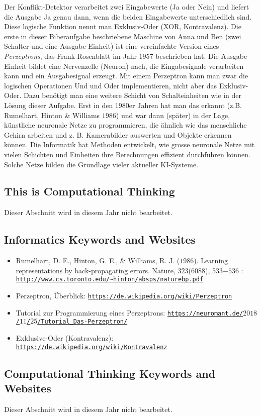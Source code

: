 \documentclass[a4paper,11pt]{report}
\newcommand{\BrochureUrlText}[1]{\texttt{#1}}
\begin{document}
Der Konflikt-Detektor verarbeitet zwei Eingabewerte (Ja oder Nein) und liefert die Ausgabe Ja genau dann, wenn die beiden Eingabewerte unterschiedlich sind. Diese logische Funktion nennt man Exklusiv-Oder (XOR, Kontravalenz). Die erste in dieser Biberaufgabe beschriebene Maschine von Anna und Ben (zwei Schalter und eine Ausgabe-Einheit) ist eine vereinfachte Version eines \emph{Perzeptrons}, das Frank Rosenblatt im Jahr $1957$ beschrieben hat. Die Ausgabe-Einheit bildet eine Nervenzelle (Neuron) nach, die Eingabesignale verarbeiten kann und ein Ausgabesignal erzeugt. Mit einem Perzeptron kann man zwar die logischen Operationen Und und Oder implementieren, nicht aber das Exklusiv-Oder. Dazu benötigt man eine weitere Schicht von Schalteinheiten wie in der Lösung dieser Aufgabe. Erst in den 1980er Jahren hat man das erkannt (z.B. Rumelhart, Hinton \& Williams $1986$) und war dann (später) in der Lage, künstliche neuronale Netze zu programmieren, die ähnlich wie das menschliche Gehirn arbeiten und z. B. Kamerabilder auswerten und Objekte erkennen können.  Die Informatik hat Methoden entwickelt, wie grosse neuronale Netze mit vielen Schichten und Einheiten ihre Berechnungen effizient durchführen können.  Solche Netze bilden die Grundlage vieler aktueller KI-Systeme.


\subsection*{This is Computational Thinking}

Dieser Abschnitt wird in diesem Jahr nicht bearbeitet.


\subsection*{Informatics Keywords and Websites}

\begin{itemize}
  \item Rumelhart, D. E., Hinton, G. E., \& Williams, R. J. ($1986$). Learning representations by back-propagating errors. Nature, $323$($6088$), 533$-536$ : \href{http://www.cs.toronto.edu/~hinton/absps/naturebp.pdf}{\BrochureUrlText{http://www.cs.toronto.edu/\textasciitilde{}hinton/absps/naturebp.pdf}}
  \item Perzeptron, Überblick: \href{https://de.wikipedia.org/wiki/Perzeptron}{\BrochureUrlText{https://de.wikipedia.org/wiki/Perzeptron}}
  \item Tutorial zur Programmierung eines Perzeptrons: \href{https://neuromant.de/2018/11/25/Tutorial_Das-Perzeptron/}{\BrochureUrlText{https://neuromant.de/$2018$/$11$/$25$/Tutorial\_Das-Perzeptron/}}
  \item Exklusive-Oder (Kontravalenz): \href{https://de.wikipedia.org/wiki/Kontravalenz}{\BrochureUrlText{https://de.wikipedia.org/wiki/Kontravalenz}}
\end{itemize}


\subsection*{Computational Thinking Keywords and Websites}

Dieser Abschnitt wird in diesem Jahr nicht bearbeitet.
\end{document}
